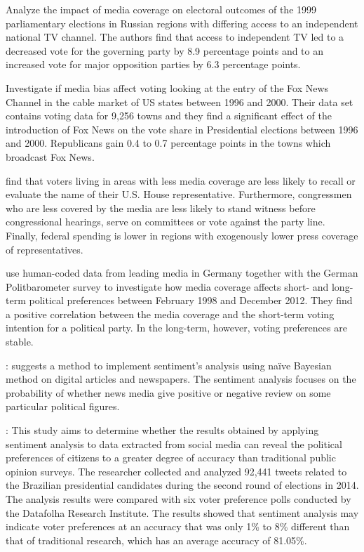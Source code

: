 \documentclass[12pt,a4paper,notitlepage]{article}
\begin{document}
\citet{enikolopov_media_2011} Analyze the impact of media coverage on electoral outcomes of the 1999 parliamentary elections in Russian regions with differing access to an independent national TV channel. The authors find that access to independent TV led to a decreased vote for the governing party by 8.9 percentage points and to an increased vote for major opposition parties by 6.3 percentage points.

\citet{dellavigna_fox_2006} Investigate if media bias affect voting looking at the entry of the Fox News Channel in the cable market of US states between 1996 and 2000. Their data set contains voting data for 9,256 towns and they find a significant effect of the introduction of Fox News on the vote share in Presidential elections between 1996 and 2000. Republicans gain 0.4 to 0.7 percentage points in the towns which broadcast Fox News.

\citet{snyder_press_2010} find that voters living in areas with less media coverage are less likely to recall or evaluate the name of their U.S. House representative. Furthermore, congressmen who are less covered by the media are less likely to stand witness before congressional hearings, serve on committees or vote against the party line. Finally, federal spending is lower in regions with exogenously lower press coverage of representatives.

\citet{dewenter_can_2018} use human-coded data from leading media in Germany together with the German Politbarometer survey to investigate how media coverage affects short- and long-term political preferences between February 1998 and December 2012. They find a positive correlation between the media coverage and the short-term voting intention for a political party. In the long-term, however, voting preferences are stable.





\citet{soelistio_simple_2015}: suggests a method to implement sentiment’s analysis using naïve Bayesian method on digital articles and newspapers. The sentiment analysis focuses on the probability of whether news media give positive or negative review on some particular political figures.

\citet{oliveira_can_2017}: This study aims to determine whether the results obtained by applying sentiment analysis to data extracted from social media can reveal the political preferences of citizens to a greater degree of accuracy than traditional public opinion surveys. The researcher collected and analyzed 92,441 tweets related to the Brazilian presidential candidates during the second round of elections in 2014. The analysis results were compared with six voter preference polls conducted by the Datafolha Research Institute. The results showed that sentiment analysis may indicate voter preferences at an accuracy that was only 1\% to 8\% different than that of traditional research, which has an average accuracy of 81.05\%.
\end{document}
